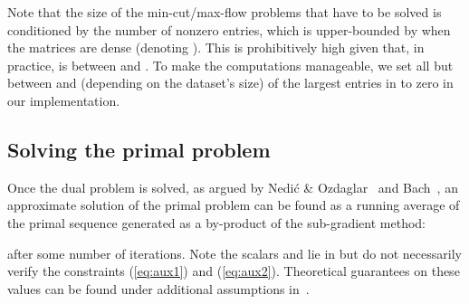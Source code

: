 \documentclass[10pt,twocolumn,letterpaper]{article}
\numberwithin{theorem}{section}
\begin{document}
Note that the size of the min-cut/max-flow problems that have to be
solved is conditioned by the number of nonzero  entries,
which is upper-bounded by  when the matrices  are
dense (denoting ).  This is prohibitively high given that, in practice,  is
between  and . To make the computations manageable, we set
all but between  and  (depending on the dataset's size) of the largest entries in  to
zero in our implementation.

\subsection{Solving the primal problem}
Once the dual problem is solved, as argued by Nedi\'c \&
Ozdaglar~\cite{NeOz09} and Bach~\cite{Bach13}, an approximate solution
of the primal problem can be found as a running average of the primal
sequence  generated as a by-product of the sub-gradient
method:
\vspace{-2mm}

after some number  of iterations.
Note the scalars  and  lie in  but
do not necessarily verify the constraints (\ref{eq:aux1}) and
(\ref{eq:aux2}). Theoretical guarantees on these values can be found
under additional assumptions in~\cite{Bach13,NeOz09}.
\end{document}
